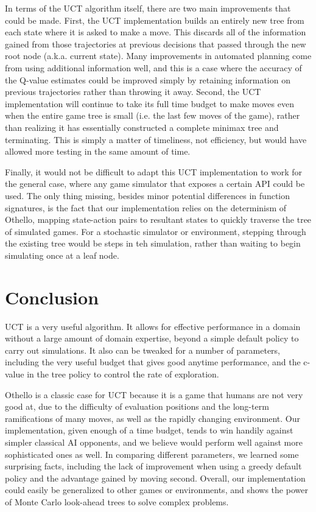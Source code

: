 \documentclass[12pt,letterpaper]{article}
\begin{document}
In terms of the UCT algorithm itself, there are two main improvements that could be made. First, the UCT implementation builds an entirely new tree from each state where it is asked to make a move. This discards all of the information gained from those trajectories at previous decisions that passed through the new root node (a.k.a. current state). Many improvements in automated planning come from using additional information well, and this is a case where the accuracy of the Q-value estimates could be improved simply by retaining information on previous trajectories rather than throwing it away. Second, the UCT implementation will continue to take its full time budget to make moves even when the entire game tree is small (i.e. the last few moves of the game), rather than realizing it has essentially constructed a complete minimax tree and terminating. This is simply a matter of timeliness, not efficiency, but would have allowed more testing in the same amount of time.

Finally, it would not be difficult to adapt this UCT implementation to work for the general case, where any game simulator that exposes a certain API could be used. The only thing missing, besides minor potential differences in function signatures, is the fact that our implementation relies on the determinism of Othello, mapping state-action pairs to resultant states to quickly traverse the tree of simulated games. For a stochastic simulator or environment, stepping through the existing tree would be steps in teh simulation, rather than waiting to begin simulating once at a leaf node.

\section{Conclusion}
\label{conc}
UCT is a very useful algorithm. It allows for effective performance in a domain without a large amount of domain expertise, beyond a simple default policy to carry out simulations. It also can be tweaked for a number of parameters, including the very useful budget that gives good anytime performance, and the c-value in the tree policy to control the rate of exploration.

Othello is a classic case for UCT because it is a game that humans are not very good at, due to the difficulty of evaluation positions and the long-term ramifications of many moves, as well as the rapidly changing environment. Our implementation, given enough of a time budget, tends to win handily against simpler classical AI opponents, and we believe would perform well against more sophisticated ones as well. In comparing different parameters, we learned some surprising facts, including the lack of improvement when using a greedy default policy and the advantage gained by moving second. Overall, our implementation could easily be generalized to other games or environments, and shows the power of Monte Carlo look-ahead trees to solve complex problems.
\end{document}
